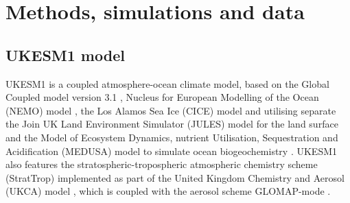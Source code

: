 
\chapter{Methods, simulations and data}
\label{ch2:title}

\ifpdf
    \graphicspath{{Chapter2/Figs/Raster/}{Chapter2/Figs/PDF/}{Chapter2/Figs/}}
\else
    \graphicspath{{Chapter2/Figs/Vector/}{Chapter2/Figs/}}
\fi


\section{UKESM1 model}  
\label{sec:1.ukesm1}
UKESM1 is a coupled atmosphere-ocean climate model, based on the Global Coupled model version 3.1 \citep[HadGEM3-GC3.1;][]{kuhlbrodtLowResolutionVersionHadGEM32018, brownUnifiedModelingPrediction2012}, Nucleus for European Modelling of the Ocean (NEMO) model \citep{storkeyUKGlobalOcean2018}, the Los Alamos Sea Ice (CICE) model \citep{ridleySeaIceModel2018} and utilising separate the Join UK Land Environment Simulator (JULES) model for the land surface \citep{bestJointUKLand2011} and the Model of Ecosystem Dynamics, nutrient Utilisation, Sequestration and Acidification (MEDUSA) model to simulate ocean biogeochemistry \citep{yoolMEDUSA2IntermediateComplexity2013}. UKESM1 also features the stratospheric-tropospheric atmospheric chemistry scheme (StratTrop) implemented as part of the United Kingdom Chemistry and Aerosol (UKCA) model \citep{archibaldDescriptionEvaluationUKCA2020}, which is coupled with the aerosol scheme GLOMAP-mode \citep{mulcahyDescriptionEvaluationAerosol2020}. 


